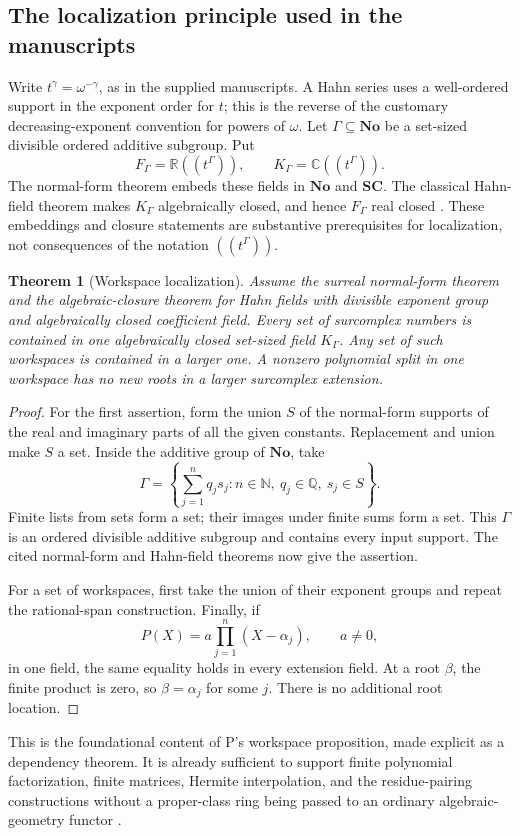 \documentclass[11pt,letterpaper]{article}
\numberwithin{equation}{section}
\newtheorem{theorem}{Theorem}[section]
\theoremstyle{definition}
\theoremstyle{remark}
\newcommand{\No}{\mathbf{No}}
\newcommand{\SC}{\mathbf{SC}}
\newcommand{\R}{\mathbb R}
\newcommand{\C}{\mathbb C}
\newcommand{\N}{\mathbb N}
\newcommand{\Q}{\mathbb Q}
\begin{document}
\subsection{The localization principle used in the manuscripts}
Write $t^\gamma=\omega^{-\gamma}$, as in the supplied manuscripts. A Hahn series uses a well-ordered support in the exponent order for $t$; this is the reverse of the customary decreasing-exponent convention for powers of $\omega$. Let $\Gamma\subseteq\No$ be a set-sized divisible ordered additive subgroup. Put
\[
F_\Gamma=\R((t^\Gamma)),\qquad K_\Gamma=\C((t^\Gamma)).
\]
The normal-form theorem embeds these fields in $\No$ and $\SC$. The classical Hahn-field theorem makes $K_\Gamma$ algebraically closed, and hence $F_\Gamma$ real closed \cite{Conway,Gonshor,Poonen}. These embeddings and closure statements are substantive prerequisites for localization, not consequences of the notation $((t^\Gamma))$.

\begin{theorem}[Workspace localization]\label{thm:workspace}
Assume the surreal normal-form theorem and the algebraic-closure theorem for Hahn fields with divisible exponent group and algebraically closed coefficient field. Every set of surcomplex numbers is contained in one algebraically closed set-sized field $K_\Gamma$. Any set of such workspaces is contained in a larger one. A nonzero polynomial split in one workspace has no new roots in a larger surcomplex extension.
\end{theorem}
\begin{proof}
For the first assertion, form the union $S$ of the normal-form supports of the real and imaginary parts of all the given constants. Replacement and union make $S$ a set. Inside the additive group of $\No$, take
\[
\Gamma=\left\{\sum_{j=1}^n q_js_j:
 n\in\N,\ q_j\in\Q,\ s_j\in S\right\}.
\]
Finite lists from sets form a set; their images under finite sums form a set. This $\Gamma$ is an ordered divisible additive subgroup and contains every input support. The cited normal-form and Hahn-field theorems now give the assertion.

For a set of workspaces, first take the union of their exponent groups and repeat the rational-span construction. Finally, if
\[
P(X)=a\prod_{j=1}^n(X-\alpha_j),\qquad a\ne0,
\]
in one field, the same equality holds in every extension field. At a root $\beta$, the finite product is zero, so $\beta=\alpha_j$ for some $j$. There is no additional root location.
\end{proof}
This is the foundational content of P's workspace proposition, made explicit as a dependency theorem. It is already sufficient to support finite polynomial factorization, finite matrices, Hermite interpolation, and the residue-pairing constructions without a proper-class ring being passed to an ordinary algebraic-geometry functor \cite{SourceP}.
\end{document}
